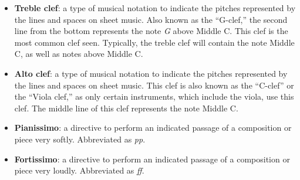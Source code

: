 \begin{itemize}
    \item {\textbf{Treble clef}: a type of musical notation to indicate the pitches represented by the lines and spaces on sheet music. Also known as the ``G-clef,'' the second line from the bottom represents the note \textit{G} above Middle C. This clef is the most common clef seen. Typically, the treble clef will contain the note Middle C, as well as notes above Middle C.}
    \item {\textbf{Alto clef}: a type of musical notation to indicate the pitches represented by the lines and spaces on sheet music. This clef is also known as the ``C-clef'' or the ``Viola clef,'' as only certain instruments, which include the viola, use this clef. The middle line of this clef represents the note Middle C.}
    \item {\textbf{Pianissimo}: a directive to perform an indicated passage of a composition or piece very softly. Abbreviated as \textit{pp}.}
    \item {\textbf{Fortissimo}: a directive to perform an indicated passage of a composition or piece very loudly. Abbreviated as \textit{ff}.}
\end{itemize}